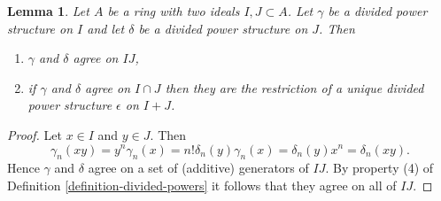 \documentclass{stacks-project}
\theoremstyle{plain}
\newtheorem{lemma}[subsection]{Lemma}
\theoremstyle{definition}
\theoremstyle{remark}
\numberwithin{equation}{subsection}
\begin{document}
\begin{lemma}
\label{lemma-two-ideals}
Let $A$ be a ring with two ideals $I, J \subset A$.
Let $\gamma$ be a divided power structure on $I$ and let
$\delta$ be a divided power structure on $J$.
Then
\begin{enumerate}
\item $\gamma$ and $\delta$ agree on $IJ$,
\item if $\gamma$ and $\delta$ agree on $I \cap J$ then they are
the restriction of a unique divided power structure $\epsilon$
on $I + J$.
\end{enumerate}
\end{lemma}

\begin{proof}
Let $x \in I$ and $y \in J$. Then
$$
\gamma_n(xy) = y^n\gamma_n(x) = n! \delta_n(y) \gamma_n(x) =
\delta_n(y) x^n = \delta_n(xy).
$$
Hence $\gamma$ and $\delta$ agree on a set of (additive) generators
of $IJ$. By property (4) of Definition \ref{definition-divided-powers}
it follows that they agree on all of $IJ$.


\end{proof}
\end{document}
